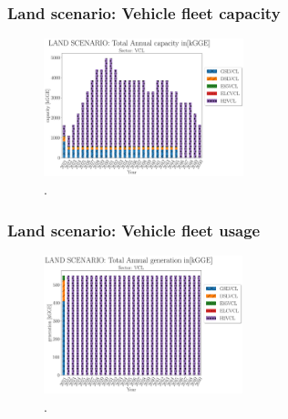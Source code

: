 \begin{frame}
  \frametitle{Land scenario: Vehicle fleet capacity}
  \begin{figure}[htbp!]
    \begin{center}
      \includegraphics[height=4cm]{./images/land scenario_vcl_capacity.png}
    \end{center}
    \caption{.} 
    \label{fig:land-vcl-cap}
  \end{figure}
\end{frame}

\begin{frame}
  \frametitle{Land scenario: Vehicle fleet usage}
  \begin{figure}[htbp!]
    \begin{center}
      \includegraphics[height=4cm]{./images/land scenario_vcl_generation.png}
    \end{center}
    \caption{.} 
    \label{fig:land-vcl-gen}
  \end{figure}
\end{frame}
